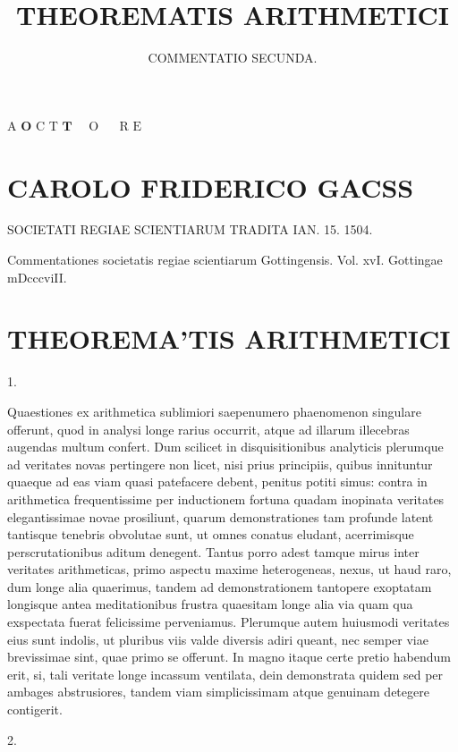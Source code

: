 \documentclass[10pt]{article}
\title{THEOREMATIS ARITHMETICI }
\author{COMMENTATIO SECUNDA.}
\date{}
\begin{document}
\maketitle
A \(\mathbf{O}\) C T \(\mathbf{T} \quad\) O \(\quad\) R \(\mathrm{E}\)

\section*{CAROLO FRIDERICO GACSS}
SOCIETATI REGIAE SCIENTIARUM TRADITA IAN. 15. 1504.

Commentationes societatis regiae scientiarum Gottingensis. Vol. xvI. Gottingae mDcccviII.

\section*{THEOREMA'TIS ARITHMETICI }


1.

Quaestiones ex arithmetica sublimiori saepenumero phaenomenon singulare offerunt, quod in analysi longe rarius occurrit, atque ad illarum illecebras augendas multum confert. Dum scilicet in disquisitionibus analyticis plerumque ad veritates novas pertingere non licet, nisi prius principiis, quibus innituntur quaeque ad eas viam quasi patefacere debent, penitus potiti simus: contra in arithmetica frequentissime per inductionem fortuna quadam inopinata veritates elegantissimae novae prosiliunt, quarum demonstrationes tam profunde latent tantisque tenebris obvolutae sunt, ut omnes conatus eludant, acerrimisque perscrutationibus aditum denegent. Tantus porro adest tamque mirus inter veritates arithmeticas, primo aspectu maxime heterogeneas, nexus, ut haud raro, dum longe alia quaerimus, tandem ad demonstrationem tantopere exoptatam longisque antea meditationibus frustra quaesitam longe alia via quam qua exspectata fuerat felicissime perveniamus. Plerumque autem huiusmodi veritates eius sunt indolis, ut pluribus viis valde diversis adiri queant, nec semper viae brevissimae sint, quae primo se offerunt. In magno itaque certe pretio habendum erit, si, tali veritate longe incassum ventilata, dein demonstrata quidem sed per ambages abstrusiores, tandem viam simplicissimam atque genuinam detegere contigerit.

2.
\end{document}
